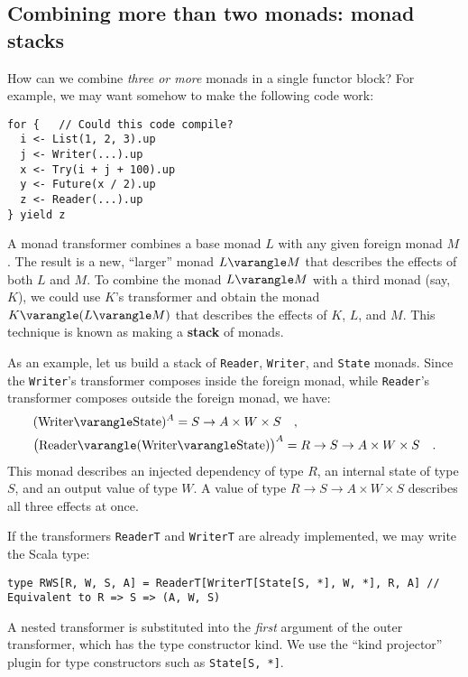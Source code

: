 \subsection{Combining more than two monads: monad stacks\label{subsec:Combining-more-than-monad-stacks}}

How can we combine \emph{three or more} monads in a single functor
block? For example, we may want somehow to make the following code
work:
\begin{lstlisting}
for {   // Could this code compile?
  i <- List(1, 2, 3).up
  j <- Writer(...).up
  x <- Try(i + j + 100).up
  y <- Future(x / 2).up
  z <- Reader(...).up
} yield z
\end{lstlisting}

A monad transformer combines a base monad $L$ with any given foreign
monad $M$. The result is a new, \textsf{``}larger\textsf{''} monad $L\varangle M$
that describes the effects of both $L$ and $M$. To combine the monad
$L\varangle M$ with a third monad (say, $K$), we could use $K$\textsf{'}s
transformer and obtain the monad $K\varangle(L\varangle M)$ that
describes the effects of $K$, $L$, and $M$. This technique is known
as making a \textbf{stack} of monads.

As an example, let us build a stack of \lstinline!Reader!, \lstinline!Writer!,
and \lstinline!State! monads. Since the \lstinline!Writer!\textsf{'}s transformer
composes inside the foreign monad, while \lstinline!Reader!\textsf{'}s transformer
composes outside the foreign monad, we have: 
\begin{align*}
 & (\text{Writer}\varangle\text{State})^{A}=S\rightarrow A\times W\times S\quad,\\
 & \big(\text{Reader}\varangle(\text{Writer}\varangle\text{State})\big)^{A}=R\rightarrow S\rightarrow A\times W\times S\quad.
\end{align*}
This monad describes an injected dependency of type $R$, an internal
state of type $S$, and an output value of type $W$. A value of type
$R\rightarrow S\rightarrow A\times W\times S$ describes all three
effects at once.

If the transformers \lstinline!ReaderT! and \lstinline!WriterT!
are already implemented, we may write the Scala type:
\begin{lstlisting}
type RWS[R, W, S, A] = ReaderT[WriterT[State[S, *], W, *], R, A] // Equivalent to R => S => (A, W, S)
\end{lstlisting}
A nested transformer is substituted into the \emph{first} argument
of the outer transformer, which has the type constructor kind. We
use the \textsf{``}kind projector\textsf{''}
plugin for type constructors such as \lstinline!State[S, *]!.

